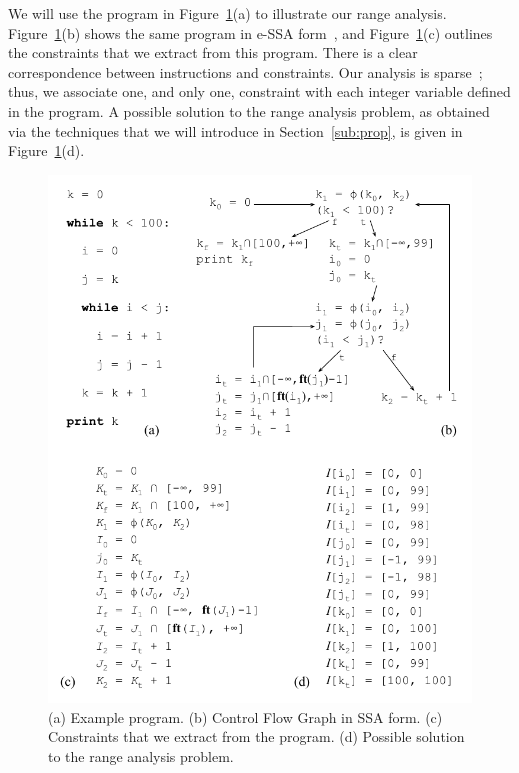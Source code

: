 \documentclass{sigplanconf}[10pt]
\begin{document}
We will use the program in Figure~\ref{fig:ex_eSSA_cgo}(a) to illustrate our
range analysis.
Figure~\ref{fig:ex_eSSA_cgo}(b) shows the same program in e-SSA
form~\cite{Bodik00},
and Figure~\ref{fig:ex_eSSA_cgo}(c) outlines the constraints that we extract
from this program.
There is a clear correspondence between instructions and constraints.
Our analysis is sparse~\cite{Choi91}; thus, we associate one, and only one,
constraint with each integer variable defined in the program.
A possible solution to the range analysis problem, as obtained via the
techniques that we will introduce in Section~\ref{sub:prop}, is given in
Figure~\ref{fig:ex_eSSA_cgo}(d).

\begin{figure}[t!]
\begin{center}
\includegraphics[width=\columnwidth]{images/ex_eSSA_cgo}
\end{center}
\caption{\label{fig:ex_eSSA_cgo}
(a) Example program.
(b) Control Flow Graph in SSA form.
(c) Constraints that we extract from the program.
(d) Possible solution to the range analysis problem.}
\end{figure}
\end{document}
